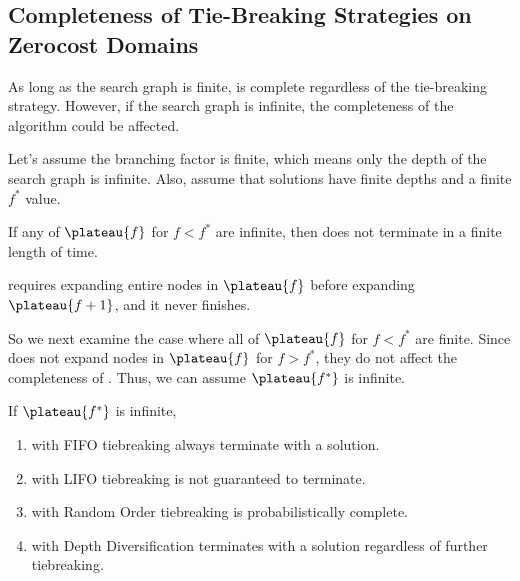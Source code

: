 
\subsection{Completeness of Tie-Breaking Strategies on Zerocost Domains}

As long as the search graph is finite, \astar is complete regardless of the tie-breaking strategy.
However, if the search graph is infinite, the completeness of the algorithm could be affected.

Let's assume the branching factor is finite, which means only the depth of the search graph is infinite.
Also, assume that solutions have finite depths and a finite $f^*$ value.

\begin{theo}
 If any of $\plateau{f}$ for $f<f^*$ are infinite, then \astar does not terminate in a finite length of time.
\end{theo}

\astar requires expanding entire nodes in $\plateau{f}$ before expanding $\plateau{f+1}$, and it never finishes.

So we next examine the case where all of $\plateau{f}$ for $f<f^*$ are finite.
Since \astar does not expand nodes in $\plateau{f}$ for $f>f^*$,
they do not affect the completeness of \astar.
Thus, we can assume $\plateau{f^*}$ is infinite.

\begin{propo}
 If $\plateau{f^*}$ is infinite,
 \begin{enumerate}
  \item \astar with FIFO tiebreaking always terminate with a solution.
        \label{item:fifo-complete}
  \item \astar with LIFO tiebreaking is not guaranteed to terminate.
        \label{item:lifo-complete}
  \item \astar with Random Order tiebreaking is probabilistically complete.
        \label{item:ro-complete}
  \item \astar with Depth Diversification terminates with a solution
        regardless of further tiebreaking.
        \label{item:depth-complete}
 \end{enumerate}
\end{propo}

